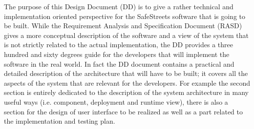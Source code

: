 The purpose of this Design Document (DD) is to give a rather technical and implementation oriented perspective for the SafeStreets software that is going to be built.
While the Requirement Analysis and Specification Document (RASD) gives a more conceptual description of the software and a view of the system that is not strictly related to the actual implementation, the DD provides a three hundred and sixty degrees guide for the developers that will implement the software in the real world. In fact the DD document contains a practical and detailed description of the architecture that will have to be built; it covers all the aspects of the system that are relevant for the developers. For example the second section is entirely dedicated to the description of the system architecture in many useful ways (i.e.  component, deployment and runtime view), there is also a section for the design of user interface to be realized as well as a part related to the implementation and testing plan.
